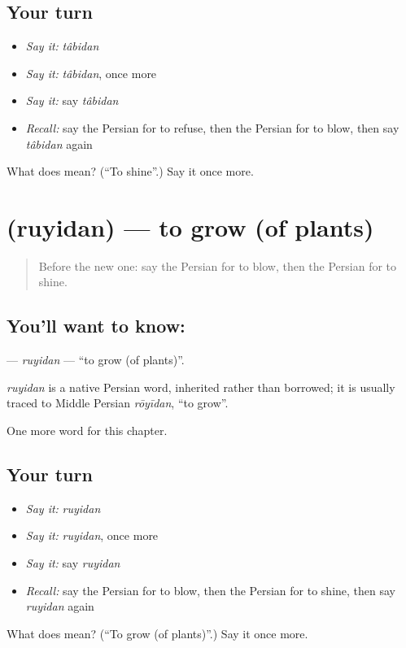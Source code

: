 \subsection*{Your turn}
\begin{itemize}
\raggedright
  \item \emph{Say it:} \emph{tâbidan}
  \item \emph{Say it:} \emph{tâbidan}, once more
  \item \emph{Say it:} say \emph{tâbidan}
  \item \emph{Recall:} say the Persian for to refuse, then the Persian for to blow, then say \emph{tâbidan} again
\end{itemize}

\begin{tcolorbox}[breakable,colback=teal!4,colframe=teal!35!black,title={Before you move on}]
What does  mean? (\textquotedblleft{}To shine\textquotedblright{}.) Say it once more.
\end{tcolorbox}
\section[\texorpdfstring{\fa{روییدن} (ruyidan)}{روییدن (ruyidan)}]{ (ruyidan) — to grow (of plants)}

\label{lesson:FA-C184-ruyidan}



\begin{quote}
Before the new one: say the Persian for to blow, then the Persian for to shine.
\end{quote}

\subsection*{You'll want to know: }
\textbf{} — \emph{ruyidan} — \textquotedblleft{}to grow (of plants)\textquotedblright{}.

\begin{cousinweb}
\emph{ruyidan} is a native Persian word, inherited rather than borrowed; it is usually traced to Middle Persian \emph{rōyīdan}, \textquotedblleft{}to grow\textquotedblright{}.
\end{cousinweb}

\begin{grammarlens}[title={What you've built}]
One more word for this chapter.
\end{grammarlens}

\subsection*{Your turn}
\begin{itemize}
\raggedright
  \item \emph{Say it:} \emph{ruyidan}
  \item \emph{Say it:} \emph{ruyidan}, once more
  \item \emph{Say it:} say \emph{ruyidan}
  \item \emph{Recall:} say the Persian for to blow, then the Persian for to shine, then say \emph{ruyidan} again
\end{itemize}

\begin{tcolorbox}[breakable,colback=teal!4,colframe=teal!35!black,title={Before you move on}]
What does  mean? (\textquotedblleft{}To grow (of plants)\textquotedblright{}.) Say it once more.
\end{tcolorbox}
